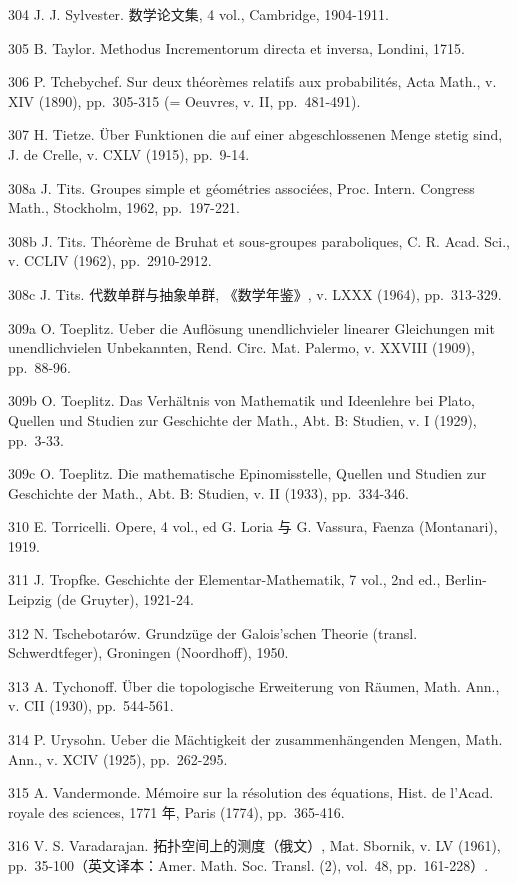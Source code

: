 304 J. J. Sylvester. 数学论文集, 4 vol., Cambridge, 1904-1911.

305 B. Taylor. Methodus Incrementorum directa et inversa, Londini, 1715.

306 P. Tchebychef. Sur deux théorèmes relatifs aux probabilités, Acta Math., v. XIV (1890), pp.~305-315 (= Oeuvres, v. II, pp.~481-491).

307 H. Tietze. Über Funktionen die auf einer abgeschlossenen Menge stetig sind, J. de Crelle, v. CXLV (1915), pp.~9-14.

308a J. Tits. Groupes simple et géométries associées, Proc. Intern. Congress Math., Stockholm, 1962, pp.~197-221.

308b J. Tits. Théorème de Bruhat et sous-groupes paraboliques, C. R. Acad. Sci., v. CCLIV (1962), pp.~2910-2912.

308c J. Tits. 代数单群与抽象单群, 《数学年鉴》, v. LXXX (1964), pp.~313-329.

309a O. Toeplitz. Ueber die Auflösung unendlichvieler linearer Gleichungen mit unendlichvielen Unbekannten, Rend. Circ. Mat. Palermo, v. XXVIII (1909), pp.~88-96.

309b O. Toeplitz. Das Verhältnis von Mathematik und Ideenlehre bei Plato, Quellen und Studien zur Geschichte der Math., Abt. B: Studien, v. I (1929), pp.~3-33.

309c O. Toeplitz. Die mathematische Epinomisstelle, Quellen und Studien zur Geschichte der Math., Abt. B: Studien, v. II (1933), pp.~334-346.

310 E. Torricelli. Opere, 4 vol., ed G. Loria 与 G. Vassura, Faenza (Montanari), 1919.

311 J. Tropfke. Geschichte der Elementar-Mathematik, 7 vol., 2nd ed., Berlin-Leipzig (de Gruyter), 1921-24.

312 N. Tschebotarów. Grundzüge der Galois'schen Theorie (transl. Schwerdtfeger), Groningen (Noordhoff), 1950.

313 A. Tychonoff. Über die topologische Erweiterung von Räumen, Math. Ann., v. CII (1930), pp.~544-561.

314 P. Urysohn. Ueber die Mächtigkeit der zusammenhängenden Mengen, Math. Ann., v. XCIV (1925), pp.~262-295.

315 A. Vandermonde. Mémoire sur la résolution des équations, Hist. de l'Acad. royale des sciences, 1771 年, Paris (1774), pp.~365-416.

316 V. S. Varadarajan. 拓扑空间上的测度（俄文）, Mat. Sbornik, v. LV (1961), pp.~35-100（英文译本：Amer. Math. Soc. Transl. (2), vol.~48, pp.~161-228）.

